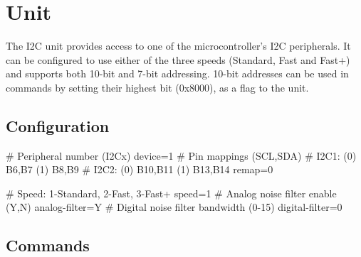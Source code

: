 \section{\IIC Unit}

The \gls{I2C} unit provides access to one of the microcontroller's \gls{I2C} peripherals. It can be configured to use either of the three speeds (Standard, Fast and Fast+) and supports both 10-bit and 7-bit addressing. 10-bit addresses can be used in commands by setting their highest bit (0x8000), as a flag to the unit.

\subsection{\IIC Configuration}

\begin{inicode}
[I2C:d@4]
# Peripheral number (I2Cx)
device=1
# Pin mappings (SCL,SDA)
#  I2C1: (0) B6,B7    (1) B8,B9
#  I2C2: (0) B10,B11  (1) B13,B14
remap=0

# Speed: 1-Standard, 2-Fast, 3-Fast+
speed=1
# Analog noise filter enable (Y,N)
analog-filter=Y
# Digital noise filter bandwidth (0-15)
digital-filter=0
\end{inicode}

\subsection{\IIC Commands}

